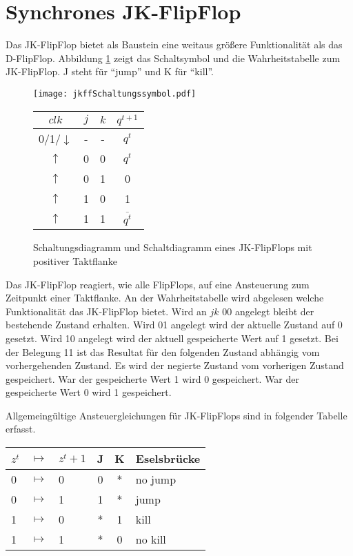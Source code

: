 \section{Synchrones JK-FlipFlop}
Das JK-FlipFlop bietet als Baustein eine weitaus größere Funktionalität als das D-FlipFlop. Abbildung \ref{jkffSym} zeigt das Schaltsymbol und die Wahrheitstabelle zum JK-FlipFlop. J steht für "`jump"' und K für "`kill"'.

\begin{figure}[htp]
	\centering
	\texttt{[image: jkffSchaltungssymbol.pdf]}
	
	\vspace{6pt}
	
	\begin{tabular}{cccc}
		$clk$            & $j$ & $k$ & $q^{t+1}$  \\ \hline
		0/1/$\downarrow$ & -   & -   & $q^t$      \\
		$\uparrow$       & 0   & 0   & $q^t$      \\
		$\uparrow$       & 0   & 1   & 0          \\		
		$\uparrow$       & 1   & 0   & 1          \\		
		$\uparrow$       & 1   & 1   & $\overline{q^t}$ \\		
	\end{tabular}
	\caption{Schaltungsdiagramm und Schaltdiagramm eines JK-FlipFlops mit positiver Taktflanke}
	\label{jkffSym}
\end{figure}

Das JK-FlipFlop reagiert, wie alle FlipFlops, auf eine Ansteuerung zum Zeitpunkt einer Taktflanke. An der Wahrheitstabelle wird abgelesen welche Funktionalität das JK-FlipFlop bietet. Wird an $jk$ 00 angelegt bleibt der bestehende Zustand erhalten. Wird 01 angelegt wird der aktuelle Zustand auf 0 gesetzt. Wird 10 angelegt wird der aktuell gespeicherte Wert auf 1 gesetzt. Bei der Belegung 11 ist das Resultat für den folgenden Zustand abhängig vom vorhergehenden Zustand. Es wird der negierte Zustand vom vorherigen Zustand gespeichert. War der gespeicherte Wert 1 wird 0 gespeichert. War der gespeicherte Wert 0 wird 1 gespeichert.

Allgemeingültige Ansteuergleichungen für JK-FlipFlops sind in folgender Tabelle erfasst.
\begin{center}
\begin{tabular}{lcl|ccl}
$z^t$ & $\mapsto$ & $z^t+1$ & J & K & Eselsbrücke\\ \hline
0 & $\mapsto$ & 0 & 0 & * & no jump\\
0 & $\mapsto$ & 1 & 1 & * & jump\\
1 & $\mapsto$ & 0 & * & 1 & kill\\
1 & $\mapsto$ & 1 & * & 0 & no kill\\
\end{tabular}
\end{center} 


